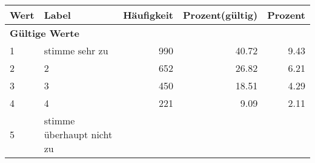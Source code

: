      \begin{longtable}{lXrrr}
     \toprule
     \textbf{Wert} & \textbf{Label} & \textbf{Häufigkeit} & \textbf{Prozent(gültig)} & \textbf{Prozent} \\
     \endhead
     \midrule
     \multicolumn{5}{l}{\textbf{Gültige Werte}}\\

     1 &
     \multicolumn{1}{X}{ stimme sehr zu   } &


       \num{990} &
       \num[round-mode=places,round-precision=2]{40,72} &
         \num[round-mode=places,round-precision=2]{9,43} \\

     2 &
     \multicolumn{1}{X}{ 2   } &


       \num{652} &
       \num[round-mode=places,round-precision=2]{26,82} &
         \num[round-mode=places,round-precision=2]{6,21} \\

     3 &
     \multicolumn{1}{X}{ 3   } &


       \num{450} &
       \num[round-mode=places,round-precision=2]{18,51} &
         \num[round-mode=places,round-precision=2]{4,29} \\

     4 &
     \multicolumn{1}{X}{ 4   } &


       \num{221} &
       \num[round-mode=places,round-precision=2]{9,09} &
         \num[round-mode=places,round-precision=2]{2,11} \\

     5 &
     \multicolumn{1}{X}{ stimme überhaupt nicht zu   } &



\end{longtable}
